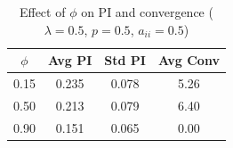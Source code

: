 
\begin{table}[H]
\centering
\small
\begin{tabular}{cccc}
\hline
$\phi$ & Avg PI & Std PI & Avg Conv \\
\hline
0.15 & 0.235 & 0.078 & 5.26 \\
0.50 & 0.213 & 0.079 & 6.40 \\
0.90 & 0.151 & 0.065 & 0.00 \\
\hline
\end{tabular}
\caption{Effect of $\phi$ on PI and convergence ($\lambda=0.5$, $p=0.5$, $a_{ii}=0.5$)}
\end{table}
